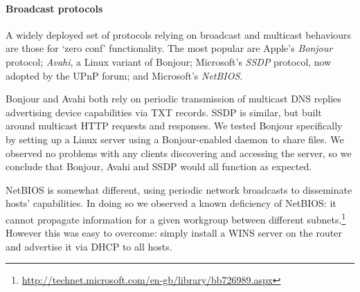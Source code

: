 
\paragraph{Broadcast protocols} A widely deployed set of protocols relying on
broadcast and multicast behaviours are those for `zero conf' functionality.  The
most popular are Apple's \emph{Bonjour} protocol; \emph{Avahi}, a Linux variant
of Bonjour; Microsoft's \emph{SSDP} protocol, now adopted by the UPnP forum; and
Microsoft's \emph{NetBIOS}.  

Bonjour and Avahi both rely on periodic transmission of multicast DNS replies
advertising device capabilities via TXT records.  SSDP is similar, but built
around multicast HTTP requests and responses.  We tested Bonjour specifically by
setting up a Linux server using a Bonjour-enabled daemon to share files.  We
observed no problems with any clients discovering and accessing the server, so
we conclude that Bonjour, Avahi and SSDP would all function as expected. 

NetBIOS is somewhat different, using periodic network broadcasts to disseminate
hosts' capabilities.  In doing so we observed a known deficiency of NetBIOS: it
cannot propagate information for a given workgroup between different
subnets.\footnote{\url{http://technet.microsoft.com/en-gb/library/bb726989.aspx}}
However this was easy to overcome: simply install a WINS server on the router
and advertise it via DHCP to all hosts.

